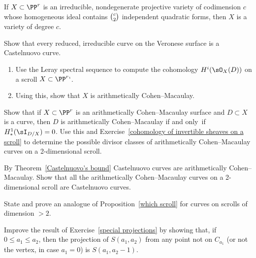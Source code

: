 \begin{exercise}\label{many quadrics}
If $X \subset \PP^r$ is an irreducible, nondegenerate projective variety
of codimension $c$ whose homogeneous ideal
contains $\tbinom{c}{2}$ independent quadratic forms, then $X$ is a
variety of degree $c$.
\end{exercise}

\begin{exercise}\label{Castelnuovo Veronese}
Show that every reduced, irreducible curve on the Veronese surface is
%
%
a Castelnuovo curve.
\end{exercise}

\begin{exercise}\label{cohomology of invertible sheaves on a scroll}
\begin{enumerate}
\item
Use the Leray spectral sequence
%
 to compute the cohomology
$H^{i}(\sO_{X}(D))$ on a scroll $X\subset \PP^r`$.
\item
Using this, show that $X$ is arithmetically Cohen--Macaulay.
%
\end{enumerate}\label{tnih17.7}
\end{exercise}

\begin{exercise}
Show that if $X\subset\PP^r$ is an arithmetically Cohen--Macaulay surface
and $D\subset X$ is a curve, then $D$ is arithmetically Cohen--Macaulay
if and only~if
$H^1_*(\sI_{D/X}) = 0$. Use this and Exercise~\ref{cohomology of
invertible sheaves on a scroll} to determine the
possible divisor classes of arithmetically Cohen--Macaulay curves on a
2-dimensional scroll.
\end{exercise}

\begin{exercise}\label{Castelnuovo scrolls}
By Theorem~\ref{Castelnuovo's bound}  Castelnuovo curves are
arithmetically Cohen--Macaulay.
Show that all the arithmetically Cohen--Macaulay curves on a 2-dimensional
scroll are
Castelnuovo curves.
%
\end{exercise}

\begin{exercise}
State and prove an analogue of Proposition~\ref{which scroll} for curves
on scrolls of dimension $>2$.
\end{exercise}

\begin{exercise}\label{general projections}
Improve the result of Exercise~\ref{special projections} by showing that,
if $0\leq a_1\leq a_2$, then
the projection of $S(a_1,a_2)$ from any point not on $C_{a_1}$ (or not
the vertex, in case $a_1=0$) is
$S(a_1, a_2-1)$.
\end{exercise}

